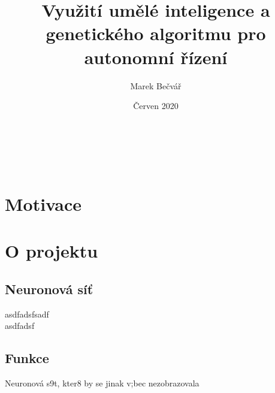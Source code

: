 \documentclass[a4paper,12pt]{article}
\title{Využití umělé inteligence a genetického algoritmu pro autonomní řízení}
\author{Marek Bečvář}
\date{Červen 2020}
\renewcommand{\maketitle}
{
    \begin{center}
        \vspace*{2cm}
        \LARGE{\textbf{\thetitle}}\\
        \vspace{0.5cm}
        \Large{\textbf{\theauthor}}\\
        \vspace{0.5cm}
        \normalsize{\thedate}
    \end{center}
}
\begin{document}
    \maketitle

    \vspace{0.5cm}

    \section{Motivace}

    \section{O projektu}
        \begin{center}
            \blindtext
        \end{center}

    \subsection{Neuronová síť}
        asdfadsfsadf\\
        asdfadsf

    \subsection{Funkce}
        \blindtext
        Neuronová s9t, kter8 by se jinak v;bec nezobrazovala
\end{document}
